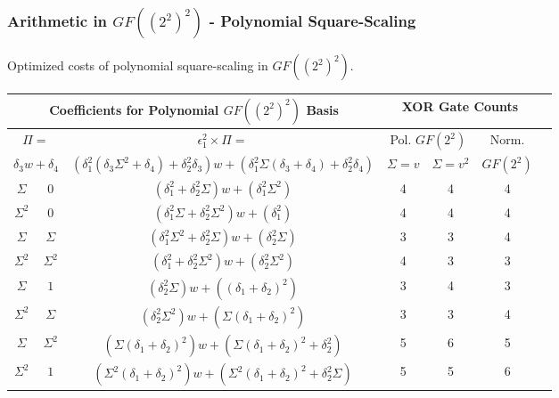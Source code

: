 \documentclass[handout,10pt]{beamer}
\begin{document}
\begin{frame}
	\frametitle{Arithmetic in $GF((2^2)^2)$ - Polynomial Square-Scaling}
	Optimized costs of polynomial square-scaling in $GF((2^2)^2)$.
\begin{table}[ht!]
\centering
\scriptsize
	\begin{tabular}{|c|c|c|c|c|c|c|} \hline
		\multicolumn{3}{|c|}{Coefficients for Polynomial $GF((2^2)^2)$ Basis} & \multicolumn{3}{c|}{XOR Gate Counts} \\ \hline
		\multicolumn{2}{|c}{$\Pi = $} & \multicolumn{1}{|c|}{$\epsilon_1^2 \times \Pi = $} & \multicolumn{2}{|c|}{Pol. $GF(2^2)$} & \multicolumn{1}{c|}{Norm.} \\
		\multicolumn{2}{|c|}{$\delta_3 w + \delta_4$} & \multicolumn{1}{c}{$(\delta_1^2(\delta_3\Sigma^2 + \delta_4) + \delta_2^2\delta_3) w + (\delta_1^2\Sigma(\delta_3 + \delta_4) + \delta_2^2\delta_4)$} & \multicolumn{1}{|c|}{$\Sigma = v$} & \multicolumn{1}{|c|}{$\Sigma = v^2$} & \multicolumn{1}{|c|}{$GF(2^2)$} \\ \hline

		$\Sigma$ & $0$          & $(\delta_1^2 + \delta_2^2\Sigma)w + (\delta_1^2\Sigma^2)$                    & 4 & 4 & 4 \\
		$\Sigma^2$ & $0$        & $(\delta_1^2\Sigma + \delta_2^2\Sigma^2)w + (\delta_1^2)$                    & 4 & 4 & 4  \\
		$\Sigma$ & $\Sigma$     & $(\delta_1^2\Sigma^2 + \delta_2^2\Sigma)w + (\delta_2^2\Sigma)$              & 3 & 3 & 4  \\
		$\Sigma^2$ & $\Sigma^2$ & $(\delta_1^2 + \delta_2^2\Sigma^2)w + (\delta_2^2\Sigma^2)$                  & 4 & 3 & 3  \\
		$\Sigma$ & $1$          & $(\delta_2^2\Sigma)w + ((\delta_1 + \delta_2)^2)$                            & 3 & 4 & 3  \\
		$\Sigma^2$ & $\Sigma$   & $(\delta_2^2\Sigma^2)w + (\Sigma(\delta_1 + \delta_2)^2)$                    & 3 & 3 & 4  \\
		$\Sigma$ & $\Sigma^2$   & $(\Sigma(\delta_1 + \delta_2)^2)w + (\Sigma(\delta_1 + \delta_2)^2 + \delta_2^2)$ & 5 & 6 & 5  \\
		$\Sigma^2$ & $1$        & $(\Sigma^2(\delta_1 + \delta_2)^2)w + (\Sigma^2(\delta_1 + \delta_2)^2 + \delta_2^2\Sigma)$ & 5 & 5 & 6 \\ \hline
    \end{tabular}
\end{table}
\end{frame}
\end{document}
